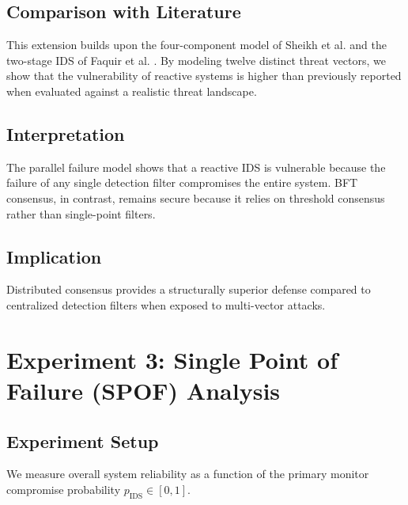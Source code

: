 \documentclass[12pt, oneside, a4paper]{report}
\theoremstyle{definition}
\theoremstyle{remark}
\begin{document}
\subsection{Comparison with Literature}
This extension builds upon the four-component model of Sheikh et al. \cite{sheikh2020} and the two-stage IDS of Faquir et al. \cite{ids_smart_meter}. By modeling twelve distinct threat vectors, we show that the vulnerability of reactive systems is higher than previously reported when evaluated against a realistic threat landscape.

\subsection{Interpretation}
The parallel failure model shows that a reactive IDS is vulnerable because the failure of any single detection filter compromises the entire system. BFT consensus, in contrast, remains secure because it relies on threshold consensus rather than single-point filters.

\subsection{Implication}
Distributed consensus provides a structurally superior defense compared to centralized detection filters when exposed to multi-vector attacks.

\bigskip

\section{Experiment 3: Single Point of Failure (SPOF) Analysis}
\label{sec:res:e3}

\subsection{Experiment Setup}
We measure overall system reliability as a function of the primary monitor compromise probability $p_{\mathrm{IDS}} \in [0, 1]$.
\end{document}
